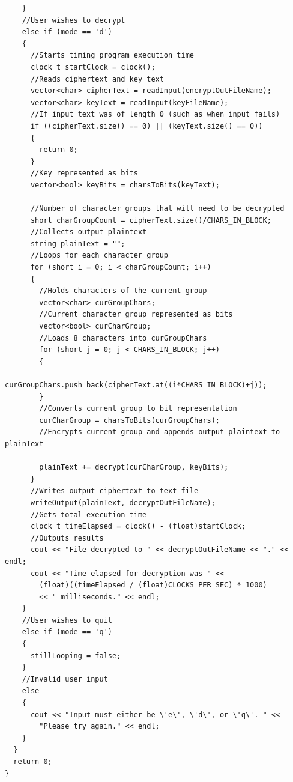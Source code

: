 \documentclass[11pt]{article}
\begin{document}
\begin{verbatim}
    }
    //User wishes to decrypt
    else if (mode == 'd')
    {
      //Starts timing program execution time
      clock_t startClock = clock();
      //Reads ciphertext and key text
      vector<char> cipherText = readInput(encryptOutFileName);
      vector<char> keyText = readInput(keyFileName);
      //If input text was of length 0 (such as when input fails)
      if ((cipherText.size() == 0) || (keyText.size() == 0))
      {
        return 0;
      }
      //Key represented as bits
      vector<bool> keyBits = charsToBits(keyText);

      //Number of character groups that will need to be decrypted
      short charGroupCount = cipherText.size()/CHARS_IN_BLOCK;
      //Collects output plaintext
      string plainText = "";
      //Loops for each character group
      for (short i = 0; i < charGroupCount; i++)
      {
        //Holds characters of the current group
        vector<char> curGroupChars;
        //Current character group represented as bits
        vector<bool> curCharGroup;
        //Loads 8 characters into curGroupChars
        for (short j = 0; j < CHARS_IN_BLOCK; j++)
        {
          curGroupChars.push_back(cipherText.at((i*CHARS_IN_BLOCK)+j));
        }
        //Converts current group to bit representation
        curCharGroup = charsToBits(curGroupChars);
        //Encrypts current group and appends output plaintext to plainText

        plainText += decrypt(curCharGroup, keyBits);
      }
      //Writes output ciphertext to text file
      writeOutput(plainText, decryptOutFileName);
      //Gets total execution time
      clock_t timeElapsed = clock() - (float)startClock;
      //Outputs results
      cout << "File decrypted to " << decryptOutFileName << "." << endl;
      cout << "Time elapsed for decryption was " <<
        (float)((timeElapsed / (float)CLOCKS_PER_SEC) * 1000)
        << " milliseconds." << endl;
    }
    //User wishes to quit
    else if (mode == 'q')
    {
      stillLooping = false;
    }
    //Invalid user input
    else
    {
      cout << "Input must either be \'e\', \'d\', or \'q\'. " <<
        "Please try again." << endl;
    }
  }
  return 0;
}


\end{verbatim}
\end{document}
